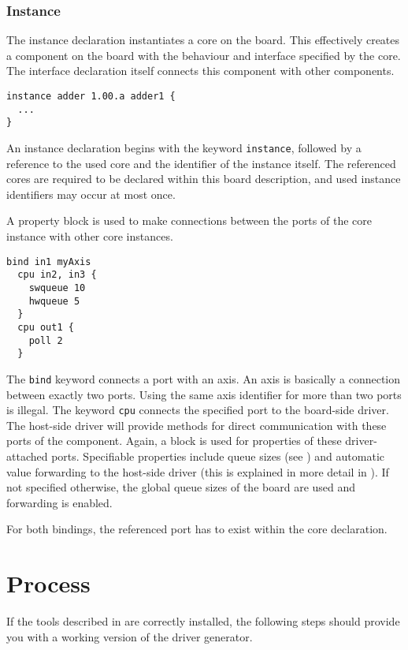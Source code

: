 \documentclass{report}
\begin{document}
\subsubsection{Instance}
The instance declaration instantiates a core on the board. This effectively creates a component on the board with the behaviour and interface specified by the core. The interface declaration itself connects this component with other components.

\begin{lstlisting}[language=bdl]
instance adder 1.00.a adder1 {
  ...
}
\end{lstlisting}

An instance declaration begins with the keyword \texttt{instance}, followed by a reference to the used core and the identifier of the instance itself. The referenced cores are required to be declared within this board description, and used instance identifiers may occur at most once.

A property block is used to make connections between the ports of the core instance with other core instances.

\begin{lstlisting}[language=bdl]
  bind in1 myAxis
  cpu in2, in3 {
    swqueue 10
    hwqueue 5
  }
  cpu out1 {
    poll 2
  }
\end{lstlisting}

The \texttt{bind} keyword connects a port with an axis. An axis is basically a connection between exactly two ports. Using the same axis identifier for more than two ports is illegal.
The keyword \texttt{cpu} connects the specified port to the board-side driver. %
The host-side driver will provide methods for direct communication with these ports of the component.
Again, a block is used for properties of these driver-attached ports. Specifiable properties include queue sizes (see ) and automatic value forwarding to the host-side driver (this is explained in more detail in ). If not specified otherwise, the global queue sizes of the board are used and forwarding is enabled.

For both bindings, the referenced port has to exist within the core declaration.

\section{Process}
\label{sec:process}
If the tools described in  are correctly installed, the following steps should provide you with a working version of the driver generator.
\end{document}

